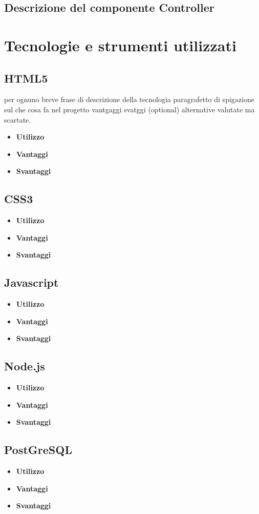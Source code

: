 \documentclass[a4paper,11pt]{article}
\begin{document}
	\subsection{Descrizione del componente Controller}
	\section{Tecnologie e strumenti utilizzati}
	\subsection{HTML5}
	per ognuno
	breve frase di descrizione della tecnologia
	paragrafetto di spigazione sul che cosa fa nel progetto
	vantgaggi
	svatggi
	(optional) alternative valutate ma scartate.
	\begin{itemize}
		\item\textbf{Utilizzo}
		\item\textbf{Vantaggi}
		\item\textbf{Svantaggi}
	\end{itemize}
	\subsection{CSS3}
	\begin{itemize}
		\item\textbf{Utilizzo}
		\item\textbf{Vantaggi}
		\item\textbf{Svantaggi}
	\end{itemize}
	\subsection{Javascript}
	\begin{itemize}
		\item\textbf{Utilizzo}
		\item\textbf{Vantaggi}
		\item\textbf{Svantaggi}
	\end{itemize}
	\subsection{Node.js}
	\begin{itemize}
		\item\textbf{Utilizzo}
		\item\textbf{Vantaggi}
		\item\textbf{Svantaggi}
	\end{itemize}
	\subsection{PostGreSQL}
	\begin{itemize}
		\item\textbf{Utilizzo}
		\item\textbf{Vantaggi}
		\item\textbf{Svantaggi}
	\end{itemize}
	
\end{document}
